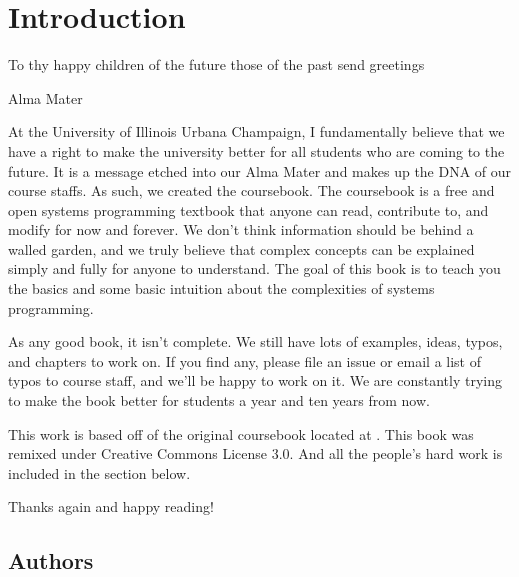 \chapter{Introduction}

\epigraph{To thy happy children of the future those of the past send greetings}{Alma Mater}

At the University of Illinois Urbana Champaign, I fundamentally believe that we have a right to make the university better for all students who are coming to the future.
It is a message etched into our Alma Mater and makes up the DNA of our course staffs.
As such, we created the coursebook.
The coursebook is a free and open systems programming textbook that anyone can read, contribute to, and modify for now and forever.
We don't think information should be behind a walled garden, and we truly believe that complex concepts can be explained simply and fully for anyone to understand.
The goal of this book is to teach you the basics and some basic intuition about the complexities of systems programming.

As any good book, it isn't complete.
We still have lots of examples, ideas, typos, and chapters to work on.
If you find any, please file an issue or email a list of typos to course staff, and we'll be happy to work on it.
We are constantly trying to make the book better for students a year and ten years from now.

This work is based off of the original coursebook located at .
This book was remixed under Creative Commons License 3.0.
And all the people's hard work is included in the section below.

Thanks again and happy reading!

\section{Authors}



